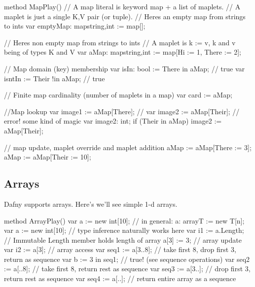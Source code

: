 \documentclass[letterpaper,10pt,english]{sphinxmanual}
\begin{document}
\begin{sphinxVerbatim}[commandchars=\\\{\}]
method MapPlay()
\PYGZob{}
    // A map literal is keyword map + a list of maplets.
    // A maplet is just a single \PYGZlt{}K,V\PYGZgt{} pair (or \PYGZdq{}tuple\PYGZdq{}).
    // Here\PYGZsq{}s an empty map from strings to ints
    var emptyMap: map\PYGZlt{}string,int\PYGZgt{} := map[];

    // Here\PYGZsq{}s non empty map from strings to ints
    // A maplet is \PYGZdq{}k := v,\PYGZdq{} k and v being of types K and V
    var aMap: map\PYGZlt{}string,int\PYGZgt{}  := map[\PYGZdq{}Hi\PYGZdq{} := 1, \PYGZdq{}There\PYGZdq{} := 2];

    // Map domain (key) membership
    var isIn: bool := \PYGZdq{}There\PYGZdq{} in aMap; // true
    var isntIn := \PYGZdq{}Their\PYGZdq{} !in aMap;    // true

    // Finite map cardinality (number of maplets in a map)
    var card := \textbar{}aMap\textbar{};

    //Map lookup
    var image1 := aMap[\PYGZdq{}There\PYGZdq{}];
    // var image2 := aMap[\PYGZdq{}Their\PYGZdq{}]; // error! some kind of magic
    var image2: int;
    if (\PYGZdq{}Their\PYGZdq{} in aMap) \PYGZob{} image2 := aMap[\PYGZdq{}Their\PYGZdq{}]; \PYGZcb{}

    // map update, maplet override and maplet addition
    aMap := aMap[\PYGZdq{}There\PYGZdq{} := 3];
    aMap := aMap[\PYGZdq{}Their\PYGZdq{} := 10];
\PYGZcb{}
\end{sphinxVerbatim}


\subsection{Arrays}
\label{\detokenize{06-dafny-language:arrays}}
Dafny supports arrays. Here’s we’ll see simple 1-d arrays.

\begin{sphinxVerbatim}[commandchars=\\\{\}]
method ArrayPlay()
\PYGZob{}
    var a := new int[10]; // in general: a: array\PYGZlt{}T\PYGZgt{} := new T[n];
    var a\PYGZsq{} := new int[10];   // type inference naturally works here
    var i1 := a.Length;      // Immutable \PYGZdq{}Length\PYGZdq{} member holds length of array
    a[3] := 3;           // array update
    var i2 := a[3];          // array access
    var seq1 := a[3..8];    // take first 8, drop first 3, return as sequence
    var b := 3 in seq1;     // true! (see sequence operations)
    var seq2 := a[..8];     // take first 8, return rest as sequence
    var seq3 := a[3..];     // drop first 3, return rest as sequence
    var seq4 := a[..];      // return entire array as a sequence
\PYGZcb{}
\end{sphinxVerbatim}
\end{document}
